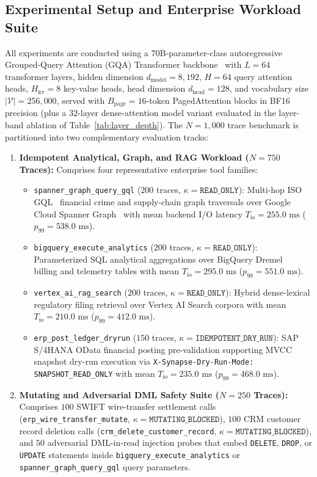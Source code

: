 \documentclass[10pt,conference]{IEEEtran}
\begin{document}
\subsection{Experimental Setup and Enterprise Workload Suite}
All experiments are conducted using a $70\text{B}$-parameter-class autoregressive Grouped-Query Attention (GQA) Transformer backbone~\cite{gemini2025report, vaswani2017attention} with $L = 64$ transformer layers, hidden dimension $d_{\text{model}} = 8{,}192$, $H = 64$ query attention heads, $H_{\text{kv}} = 8$ key-value heads, head dimension $d_{\text{head}} = 128$, and vocabulary size $|\mathcal{V}| = 256{,}000$, served with $B_{\text{page}} = 16$-token PagedAttention blocks in BF16 precision (plus a $32$-layer dense-attention model variant evaluated in the layer-band ablation of Table~\ref{tab:layer_depth}). The $N = 1{,}000$ trace benchmark is partitioned into two complementary evaluation tracks:
\begin{enumerate}
    \item \textbf{Idempotent Analytical, Graph, and RAG Workload ($N = 750$ Traces):} Comprises four representative enterprise tool families:
    \begin{itemize}
        \item \texttt{spanner\_graph\_query\_gql} ($200$ traces, $\kappa = \texttt{READ\_ONLY}$): Multi-hop ISO GQL~\cite{iso2024gql} financial crime and supply-chain graph traversals over Google Cloud Spanner Graph~\cite{corbett2012spanner} with mean backend I/O latency $T_{\text{io}} = 255.0\text{ ms}$ ($p_{99} = 538.0\text{ ms}$).
        \item \texttt{bigquery\_execute\_analytics} ($200$ traces, $\kappa = \texttt{READ\_ONLY}$): Parameterized SQL analytical aggregations over BigQuery Dremel~\cite{melnik2010dremel} billing and telemetry tables with mean $T_{\text{io}} = 295.0\text{ ms}$ ($p_{99} = 551.0\text{ ms}$).
        \item \texttt{vertex\_ai\_rag\_search} ($200$ traces, $\kappa = \texttt{READ\_ONLY}$): Hybrid dense-lexical regulatory filing retrieval over Vertex AI Search corpora with mean $T_{\text{io}} = 210.0\text{ ms}$ ($p_{99} = 412.0\text{ ms}$).
        \item \texttt{erp\_post\_ledger\_dryrun} ($150$ traces, $\kappa = \texttt{IDEMPOTENT\_DRY\_RUN}$): SAP S/4HANA OData financial posting pre-validation supporting MVCC snapshot dry-run execution via \texttt{X-Synapse-Dry-Run-Mode: SNAPSHOT\_READ\_ONLY} with mean $T_{\text{io}} = 235.0\text{ ms}$ ($p_{99} = 468.0\text{ ms}$).
    \end{itemize}
    \item \textbf{Mutating and Adversarial DML Safety Suite ($N = 250$ Traces):} Comprises $100$ SWIFT wire-transfer settlement calls (\texttt{erp\_wire\_transfer\_mutate}, $\kappa = \texttt{MUTATING\_BLOCKED}$), $100$ CRM customer record deletion calls (\texttt{crm\_delete\_customer\_record}, $\kappa = \texttt{MUTATING\_BLOCKED}$), and $50$ adversarial DML-in-read injection probes that embed \texttt{DELETE}, \texttt{DROP}, or \texttt{UPDATE} statements inside \texttt{bigquery\_execute\_analytics} or \texttt{spanner\_graph\_query\_gql} query parameters.
\end{enumerate}
\end{document}
